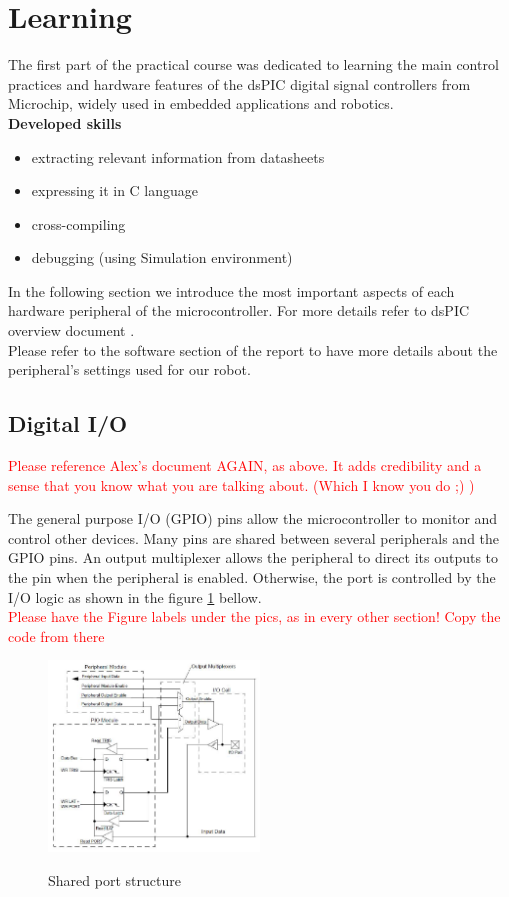 \section{Learning}
\noindent
The first part of the practical course was dedicated to learning the main control practices and hardware features of the dsPIC digital signal controllers from Microchip, widely used in embedded applications and robotics.\\

\noindent
\textbf{Developed skills}
\begin{itemize}
    \item extracting relevant information from datasheets
    \item expressing it in C language
    \item cross-compiling
    \item debugging (using Simulation environment)
\end{itemize}

\noindent
In the following section we introduce the most important aspects of each hardware peripheral of the microcontroller. For more details refer to dsPIC overview document \cite{alex}.\\
Please refer to the software section of the report to have more details about the peripheral’s settings used for our robot.

\subsection{Digital I/O}

\textcolor{red}{Please reference Alex's document AGAIN, as above. It adds credibility and a sense that you know what you are talking about. (Which I know you do ;) )}

The general purpose I/O (GPIO) pins allow the microcontroller to monitor and control other devices. Many pins are shared between several peripherals and the GPIO pins. An output multiplexer allows the peripheral to direct its outputs to the pin when the peripheral is enabled. Otherwise, the port is controlled by the I/O logic as shown in the figure \ref{fig:gpio} bellow.\\

\textcolor{red}{Please have the Figure labels under the pics, as in every other section! Copy the code from there}

\begin{figure}[H]
    \caption{Shared port structure \cite{alex}}
        \centering
            \includegraphics[width=0.5\textwidth]{figures/software/GPIO.PNG}
            \label{fig:gpio}
\end{figure}

